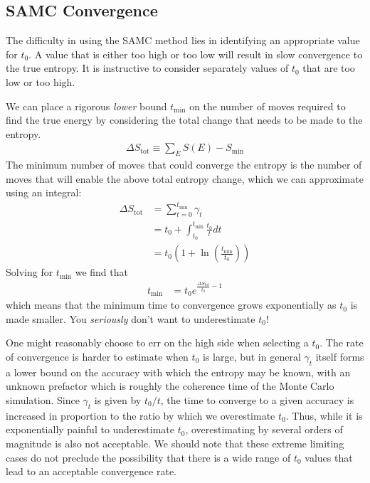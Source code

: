 \documentclass[letterpaper,twocolumn,amsmath,amssymb,pre,aps,10pt]{revtex4-1}
\begin{document}
\subsection{SAMC Convergence}\label{sec:samc-convergence}
The difficulty in using the SAMC method lies in identifying an appropriate
value for $t_0$.  A value that is either too high or too low will result
in slow convergence to the true entropy.  It is instructive to consider
separately values of $t_0$ that are too low or too high.

We can place a rigorous \emph{lower} bound $t_{\min}$ on the number of
moves required to find the true energy by considering the total change
that needs to be made to the entropy.
\begin{align}
  \Delta S_{\text{tot}} \equiv \sum_E S(E) - S_{\min}
\end{align}
The minimum number of moves that could converge the entropy is
the number of moves that will enable the above total entropy change,
which we can approximate using an integral:
\begin{align}
   \Delta S_{\text{tot}} &= \sum_{t=0}^{t_{\min}} \gamma_t \\
  &= t_0 + \int_{t_0}^{t_{\min}} \frac{t_0}{t}dt
  \\
  &= t_0\left(1 + \ln\left(\frac{t_{\min}}{t_0}\right)\right)
\end{align}
Solving for ${t_{\min}}$ we find that
\begin{align}
  {t_{\min}} &= t_0 e^{\frac{\Delta S_{\text{tot}}}{t_0} - 1}
\end{align}
which means that the minimum time to convergence grows exponentially
as $t_0$ is made smaller.  You \emph{seriously} don't want to underestimate
$t_0$!

One might reasonably choose to err on the high side when selecting a $t_0$.
The rate of convergence is harder to estimate when $t_0$ is large, but
in general $\gamma_t$ itself forms a lower bound on the accuracy with which
the entropy may be known, with an unknown prefactor which is roughly
the coherence time of the Monte Carlo simulation.  Since $\gamma_t$ is
given by $t_0/t$, the time to converge to a given accuracy is increased
in proportion to the ratio by which we overestimate $t_0$.  Thus, while
it is exponentially painful to underestimate $t_0$, overestimating by
several orders of magnitude is also not acceptable.  We should note
that these extreme limiting cases do not preclude the possibility that there
is a wide range of $t_0$ values that lead to an acceptable convergence
rate.
\end{document}
